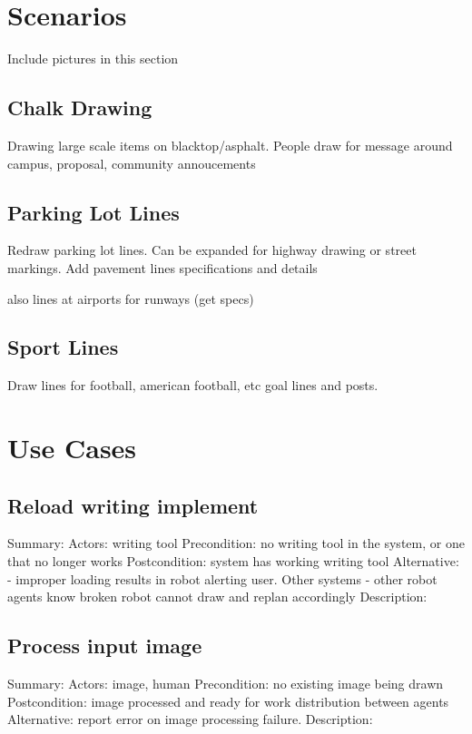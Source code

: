 
\section{Scenarios}
\label{sec:scenarios}
Include pictures in this section

\subsection{Chalk Drawing}
Drawing large scale items on blacktop/asphalt. People draw for message around campus, proposal, community annoucements

\subsection{Parking Lot Lines}
Redraw parking lot lines. Can be expanded for highway drawing or street markings. Add pavement lines specifications and details

also lines at airports for runways (get specs)

\subsection{Sport Lines}
Draw lines for football, american football, etc goal lines and posts. 


\section{Use Cases}
\label{sec:use_cases}

\subsection{Reload writing implement}
Summary: 
Actors:  writing tool
Precondition: no writing tool in the system, or one that no longer works
Postcondition: system has working writing tool
Alternative: - improper loading results in robot alerting user. Other systems
             - other robot agents know broken robot cannot draw and replan accordingly
Description:

\subsection{Process input image}
Summary:
Actors: image, human
Precondition:  no existing image being drawn
Postcondition: image processed and ready for work distribution between agents
Alternative: report error on image processing failure.
Description:

